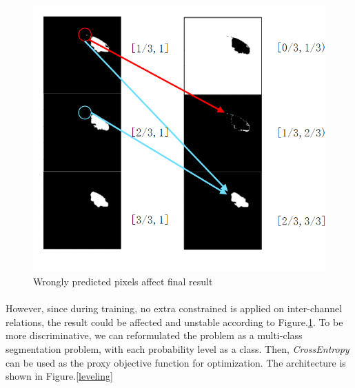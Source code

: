 \documentclass[12pt]{extarticle}
\begin{document}
\begin{figure}[ht!]
\centering
\includegraphics[scale=0.3]{fig7.png}
\caption{Wrongly predicted pixels affect final result}
\label{WrongResult}
\end{figure}
\paragraph{}
However, since during training, no extra constrained is applied on inter-channel relations, the result could be 
affected and unstable according to Figure.\ref{WrongResult}. To be more discriminative, we can reformulated the 
problem as a multi-class segmentation problem, with each probability level as a class. Then, \textit{CrossEntropy} can 
be used as the proxy objective function for optimization. The architecture is shown in Figure.\ref{leveling}
\end{document}
